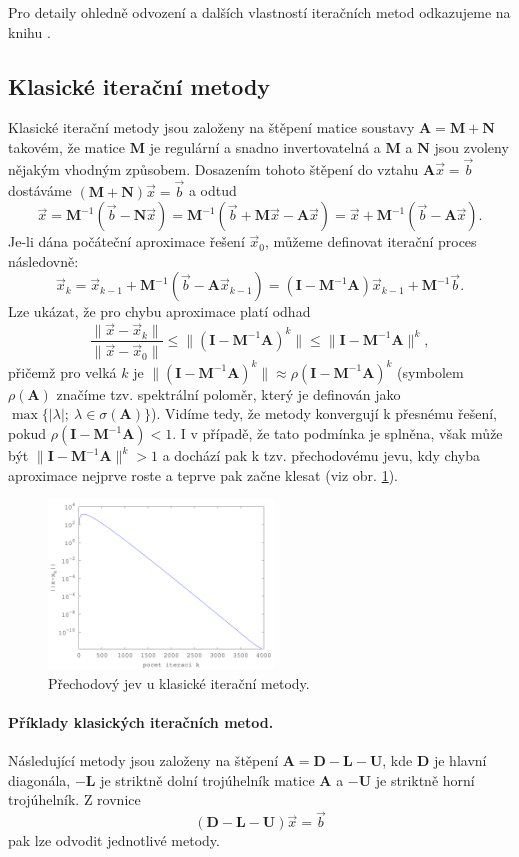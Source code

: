\documentclass{article}
\newcommand{\0}{\vec{0}}
\newcommand{\A}{\mat A}
\newcommand{\bb}{\vec{b}}
\newcommand{\I}{\mat I}
\newcommand{\mat}[1]{\mathbf{#1}}
\newcommand{\norm}[1]{\|#1\|}
\newcommand{\xx}{\vec{x}}
\begin{document}
Pro detaily ohledně odvození a dalších vlastností iteračních metod odkazujeme na knihu \cite{analyza_metod_maticove_vyp}.



\subsection{Klasické iterační metody}

Klasické iterační metody jsou založeny na štěpení matice soustavy $\A = \mat M + \mat N$ takovém, že matice $\mat M$ je regulární a snadno invertovatelná a $\mat M$ a $\mat N$ jsou zvoleny nějakým vhodným způsobem.
Dosazením tohoto štěpení do vztahu $\mat A\xx = \bb$ dostáváme $(\mat M + \mat N)\xx = \bb$ a odtud
$$ \xx = \mat M^{-1}(\bb - \mat N\xx) = \mat M^{-1}(\bb + \mat M\xx - \mat A\xx) = \xx + \mat M^{-1}(\bb - \mat A\xx). $$
Je-li dána počáteční aproximace řešení $\xx_0$, můžeme definovat iterační proces následovně:
$$ \xx_k = \xx_{k-1} + \mat M^{-1} (\bb - \mat A\xx_{k-1} )
= (\I - \mat M^{-1}\mat A)\xx_{k-1} + \mat M^{-1}\bb. $$
Lze ukázat, že pro chybu aproximace platí odhad
$$ \frac{\norm{\xx-\xx_k}}{\norm{\xx-\xx_0}} \le \norm{(\I-\mat M^{-1}\A)^k} \le \norm{\I-\mat M^{-1}\A}^k, $$
přičemž pro velká $k$ je $\norm{(\I-\mat M^{-1}\A)^k}\approx\rho(\I-\mat M^{-1}\A)^k$ (symbolem $\rho(\A)$ značíme tzv. spektrální poloměr, který je definován jako $\max\{|\lambda|;~\lambda\in\sigma(\A)\}$).
Vidíme tedy, že metody konvergují k přesnému řešení, pokud $\rho(\I-\mat M^{-1}\A)<1$.
I v případě, že tato podmínka je splněna, však může být $\norm{\I-\mat M^{-1}\A}^k>1$ a dochází pak k tzv. přechodovému jevu, kdy chyba aproximace nejprve roste a teprve pak začne klesat (viz obr. \ref{fig:prechod}).
\begin{figure}
\centering
\includegraphics[width=6cm]{img/prechod}
\caption{Přechodový jev u klasické iterační metody.}
\label{fig:prechod}
\end{figure}


\paragraph{Příklady klasických iteračních metod.}
Následující metody jsou založeny na štěpení $\A=\mat D-\mat L-\mat U$, kde $\mat D$ je hlavní diagonála, $-\mat L$ je striktně dolní trojúhelník matice $\A$ a $-\mat U$ je striktně horní trojúhelník.
Z rovnice
$$ (\mat D-\mat L-\mat U)\xx=\bb $$
pak lze odvodit jednotlivé metody.
\end{document}
